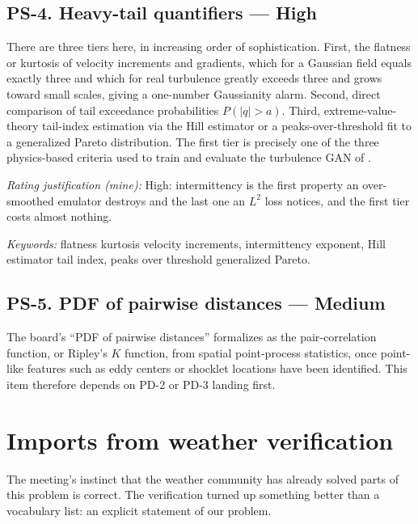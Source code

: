 \documentclass[11pt]{article}
\newcommand{\High}{\textbf{High}}
\newcommand{\Med}{Medium}
\newcommand{\keywords}[1]{\par\smallskip\noindent\textit{Keywords:} #1}
\newcommand{\rating}[1]{\par\smallskip\noindent\textit{Rating justification (mine):} #1}
\begin{document}
\subsection{PS-4. Heavy-tail quantifiers --- \High{}}

There are three tiers here, in increasing order of sophistication. First, the flatness or
kurtosis of velocity increments and gradients, which for a Gaussian field equals exactly
three and which for real turbulence greatly exceeds three and grows toward small scales,
giving a one-number Gaussianity alarm. Second, direct comparison of tail exceedance
probabilities $P(|q| > a)$. Third, extreme-value-theory tail-index estimation via the Hill
estimator or a peaks-over-threshold fit to a generalized Pareto distribution. The first tier
is precisely one of the three physics-based criteria used to train and evaluate the
turbulence GAN of \cite{granero2024}.

\rating{High: intermittency is the first property an over-smoothed emulator destroys and the
last one an $L^2$ loss notices, and the first tier costs almost nothing.}

\keywords{flatness kurtosis velocity increments, intermittency exponent, Hill estimator tail
index, peaks over threshold generalized Pareto.}

\subsection{PS-5. PDF of pairwise distances --- \Med{}}

The board's ``PDF of pairwise distances'' formalizes as the pair-correlation function, or
Ripley's $K$ function, from spatial point-process statistics, once point-like features such
as eddy centers or shocklet locations have been identified. This item therefore depends on
PD-2 or PD-3 landing first.

\section{Imports from weather verification}

The meeting's instinct that the weather community has already solved parts of this problem
is correct. The verification turned up something better than a vocabulary list: an explicit
statement of our problem.
\end{document}
